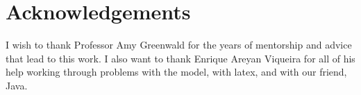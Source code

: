 \section{Acknowledgements}
I wish to thank Professor Amy Greenwald for the years of mentorship and advice that lead to this work. I also want to thank Enrique Areyan Viqueira for all of his help working through problems with the model, with latex, and with our friend, Java.

\newpage


